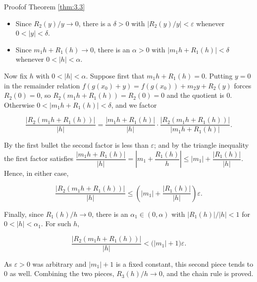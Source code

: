 \documentclass[a4paper,12pt,oneside]{memoir}
\begin{document}
\begin{envproof}{Proof}{}{of Theorem \ref{thm:3.3}}
\begin{itemize}
  \item Since \(R_{2}(y)/y \to 0\), there is a \(\delta > 0\) with \(\left\lvert R_{2}(y)/y \right\rvert < \varepsilon\) whenever \(0 < \lvert y \rvert < \delta\).
  \item Since \(m_{1} h + R_{1}(h) \to 0\), there is an \(\alpha > 0\) with \(\lvert m_{1} h + R_{1}(h) \rvert < \delta\) whenever \(0 < \lvert h \rvert < \alpha\).
\end{itemize}
Now fix \(h\) with \(0 < \lvert h \rvert < \alpha\). Suppose first that \(m_{1} h + R_{1}(h) = 0\). Putting \(y = 0\) in the remainder relation \(f(g(x_{0}) + y) = f(g(x_{0})) + m_{2} y + R_{2}(y)\) forces \(R_{2}(0) = 0\), so \(R_{2}(m_{1} h + R_{1}(h)) = R_{2}(0) = 0\) and the quotient is \(0\). Otherwise \(0 < \lvert m_{1} h + R_{1}(h) \rvert < \delta\), and we factor

\[ \frac{\lvert R_{2}(m_{1} h + R_{1}(h)) \rvert}{\lvert h \rvert} = \frac{\lvert m_{1} h + R_{1}(h) \rvert}{\lvert h \rvert} \cdot \frac{\lvert R_{2}(m_{1} h + R_{1}(h)) \rvert}{\lvert m_{1} h + R_{1}(h) \rvert}. \]

By the first bullet the second factor is less than \(\varepsilon\); and by the triangle inequality the first factor satisfies \(\dfrac{\lvert m_{1} h + R_{1}(h) \rvert}{\lvert h \rvert} = \left\lvert m_{1} + \dfrac{R_{1}(h)}{h} \right\rvert \le \lvert m_{1} \rvert + \dfrac{\lvert R_{1}(h) \rvert}{\lvert h \rvert}\). Hence, in either case,

\[ \frac{\lvert R_{2}(m_{1} h + R_{1}(h)) \rvert}{\lvert h \rvert} \le \left( \lvert m_{1} \rvert + \frac{\lvert R_{1}(h) \rvert}{\lvert h \rvert} \right)\varepsilon. \]

Finally, since \(R_{1}(h)/h \to 0\), there is an \(\alpha_{1} \in (0, \alpha)\) with \(\lvert R_{1}(h) \rvert/\lvert h \rvert < 1\) for \(0 < \lvert h \rvert < \alpha_{1}\). For such \(h\),

\[ \frac{\lvert R_{2}(m_{1} h + R_{1}(h)) \rvert}{\lvert h \rvert} < \bigl( \lvert m_{1} \rvert + 1 \bigr)\varepsilon. \]

As \(\varepsilon > 0\) was arbitrary and \(\lvert m_{1} \rvert + 1\) is a fixed constant, this second piece tends to \(0\) as well. Combining the two pieces, \(R_{3}(h)/h \to 0\), and the chain rule is proved.
\end{envproof}
\end{document}
